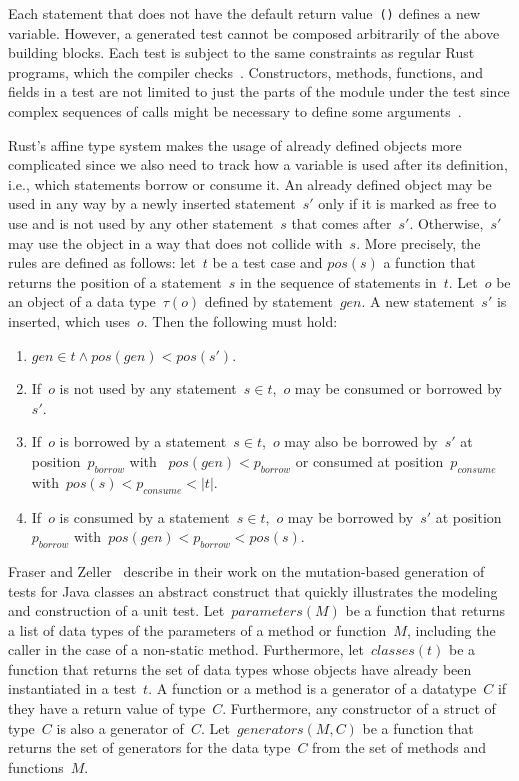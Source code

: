 \documentclass[paper=a4,%
  twoside,%
  BCOR4mm,%
  abstract=true,%
  toc=bibliography,%
  chapterprefix=true,%
  toc=bibliographynumbered,%
  open=right,%
  english,%
  pagesize=pdftex]{scrreprt}
\begin{document}
Each statement that does not have the default return value~\texttt{()} defines a new variable. However, a generated test cannot be composed arbitrarily of the above building blocks. Each test is subject to the same constraints as regular Rust programs, which the compiler checks~\cite{Tonella2004}. Constructors, methods, functions, and fields in a test are not limited to just the parts of the module under the test since complex sequences of calls might be necessary to define some arguments~\cite{Fraser2012}.

Rust's affine type system makes the usage of already defined objects more complicated since we also need to track how a variable is used after its definition, i.e., which statements borrow or consume it. An already defined object may be used in any way by a newly inserted statement~$s'$ only if it is marked as free to use and is not used by any other statement~$s$ that comes after~$s'$. Otherwise,~$s'$ may use the object in a way that does not collide with~$s$. More precisely, the rules are defined as follows: let~$t$ be a test case and $pos(s)$ a function that returns the position of a statement~$s$ in the sequence of statements in~$t$. Let~$o$ be an object of a data type~$\tau(o)$ defined by statement~$gen$. A new statement~$s'$ is inserted, which uses~$o$. Then the following must hold:
\begin{enumerate}
    \item $gen \in t \wedge pos(gen) < pos(s')$.
    \item If~$o$ is not used by any statement~$s \in t$,~$o$ may be consumed or borrowed by~$s'$.
    \item If~$o$ is borrowed by a statement~$s \in t$,~$o$ may also be borrowed by~$s'$ at position~$p_{borrow}$ with ~$pos(gen) < p_{borrow}$ or consumed at position~$p_{consume}$ with~$pos(s) < p_{consume} < \left|t\right|$.
    \item If~$o$ is consumed by a statement~$s \in t$,~$o$ may be borrowed by~$s'$ at position~$p_{borrow}$ with~$pos(gen) < p_{borrow} < pos(s)$.
\end{enumerate}

Fraser and Zeller~\cite{Fraser2012} describe in their work on the mutation-based generation of tests for Java classes an abstract construct that quickly illustrates the modeling and construction of a unit test. Let~$parameters(M)$ be a function that returns a list of data types of the parameters of a method or function~$M$, including the caller in the case of a non-static method. Furthermore, let~$classes(t)$ be a function that returns the set of data types whose objects have already been instantiated in a test~$t$. A function or a method is a generator of a datatype~$C$ if they have a return value of type~$C$. Furthermore, any constructor of a struct of type~$C$ is also a generator of~$C$. Let~$generators(M,C)$ be a function that returns the set of generators for the data type~$C$ from the set of methods and functions~$M$.
\end{document}
